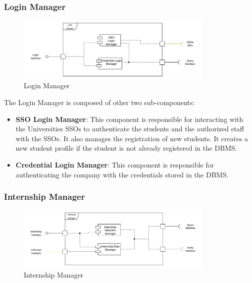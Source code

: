 \subsubsection{Login Manager}
\label{subsub:login-manager}%

\begin{figure}[H]
      \centering
      \includegraphics[width=0.85\textwidth]{Images/Login_Architecture.pdf}
      \caption{Login Manager}
      \label{login-manager-arch}
\end{figure}

\par The Login Manager is composed of other two sub-components:
\begin{itemize}
      \item \textbf{SSO Login Manager}: This component is responsible for interacting with the Universities SSOs to authenticate 
      the students and the authorized staff with the SSOs. It also manages the registration of new students. 
      It creates a new student profile if the student is not already registered in the DBMS.
      \item \textbf{Credential Login Manager}: This component is responsible for authenticating the company with the credentials
      stored in the DBMS. 
\end{itemize}

\subsubsection{Internship Manager}
\label{subsub:internship-manager}%

\begin{figure}[H]
      \centering
      \includegraphics[width=0.85\textwidth]{Images/Internship_Architecture.pdf}
      \caption{Internship Manager}
      \label{internship-manager-arch}
\end{figure}

